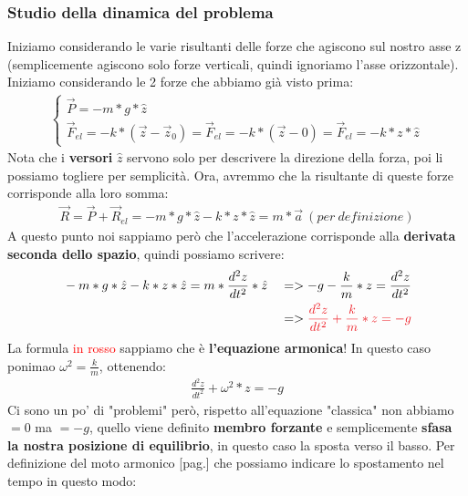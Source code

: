         \subsubsection{Studio della dinamica del problema}
            Iniziamo considerando le varie risultanti delle forze che agiscono sul nostro asse z (semplicemente agiscono solo forze verticali, quindi ignoriamo l'asse orizzontale). Iniziamo considerando le 2 forze che abbiamo già visto prima:
            \begin{align*}
                \begin{cases}
                    \vec{P} = -m*g*\hat{z}\\
                    \vec{F}_{el}=-k*(\vec{z}-\vec{z}_0) = \vec{F}_{el}=-k*(\vec{z}-0) = \vec{F}_{el}=-k*z*\hat{z}
                \end{cases}
            \end{align*}
            Nota che i \textbf{versori} $\hat{z}$ servono solo per descrivere la direzione della forza, poi li possiamo togliere per semplicità. Ora, avremmo che la risultante di queste forze corrisponde alla loro somma:
            \begin{align*}
                \vec{R} = \vec{P}+\vec{R}_{el} = -m*g*\hat{z}-k*z*\hat{z} = m*\vec{a}\ (per\ definizione)
            \end{align*}
            A questo punto noi sappiamo però che l'accelerazione corrisponde alla \textbf{derivata seconda dello spazio}, quindi possiamo scrivere:
            \begin{align*}
                &-m*g*\hat{z}-k*z*\hat{z} = m*\frac{d^2z}{dt^2}*\hat{z} &&=> -g - \frac{k}{m}*z = \frac{d^2z}{dt^2}\\
                & && => \textcolor{Red}{\frac{d^2z}{dt^2}+\frac{k}{m}*z=-g}
            \end{align*}
            La formula \textcolor{Red}{in rosso} sappiamo che è \textbf{l'equazione armonica}! In questo caso ponimao $\omega^2=\frac{k}{m}$, ottenendo:
            \begin{align*}
                \frac{d^2z}{dt^2}+\omega^2*z=-g
            \end{align*}
            Ci sono un po' di "problemi" però, rispetto all'equazione "classica" non abbiamo $=0$ ma $=-g$, quello viene definito \textbf{membro forzante} e semplicemente \textbf{sfasa la nostra posizione di equilibrio}, in questo caso la sposta verso il basso. Per definizione del moto armonico [pag.\pageref{Moto armonico}] che possiamo indicare lo spostamento nel tempo in questo modo:

